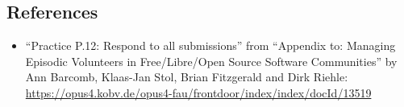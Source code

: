 \hypertarget{references}{%
\subsection{References}\label{references}}

\begin{itemize}
\tightlist
\item
  ``Practice P.12: Respond to all submissions'' from ``Appendix to:
  Managing Episodic Volunteers in Free/Libre/Open Source Software
  Communities'' by Ann Barcomb, Klaas-Jan Stol, Brian Fitzgerald and
  Dirk Riehle:
  \url{https://opus4.kobv.de/opus4-fau/frontdoor/index/index/docId/13519}
\end{itemize}
